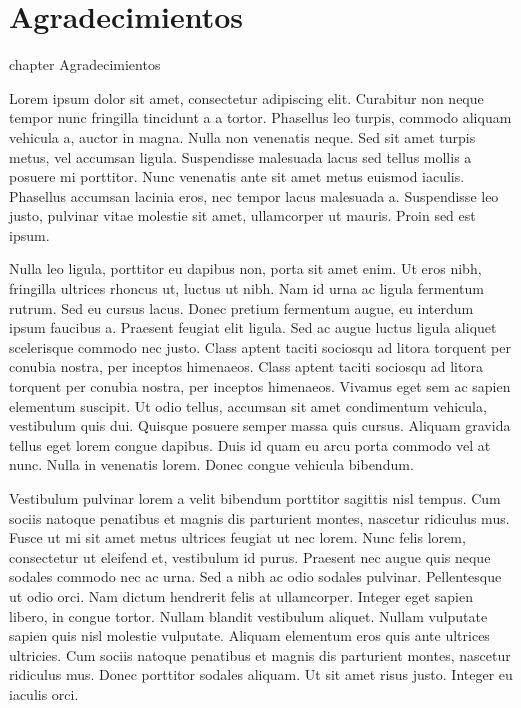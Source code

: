 \chapter*{Agradecimientos}
 {chapter} {Agradecimientos}%



Lorem ipsum dolor sit amet, consectetur adipiscing elit. Curabitur non
neque tempor nunc fringilla tincidunt a a tortor. Phasellus leo
turpis, commodo aliquam vehicula a, auctor in magna. Nulla non
venenatis neque. Sed sit amet turpis metus, vel accumsan
ligula. Suspendisse malesuada lacus sed tellus mollis a posuere mi
porttitor. Nunc venenatis ante sit amet metus euismod
iaculis. Phasellus accumsan lacinia eros, nec tempor lacus malesuada
a. Suspendisse leo justo, pulvinar vitae molestie sit amet,
ullamcorper ut mauris. Proin sed est ipsum.

Nulla leo ligula, porttitor eu dapibus non, porta sit amet enim. Ut
eros nibh, fringilla ultrices rhoncus ut, luctus ut nibh. Nam id urna
ac ligula fermentum rutrum. Sed eu cursus lacus. Donec pretium
fermentum augue, eu interdum ipsum faucibus a. Praesent feugiat elit
ligula. Sed ac augue luctus ligula aliquet scelerisque commodo nec
justo. Class aptent taciti sociosqu ad litora torquent per conubia
nostra, per inceptos himenaeos. Class aptent taciti sociosqu ad litora
torquent per conubia nostra, per inceptos himenaeos. Vivamus eget sem
ac sapien elementum suscipit. Ut odio tellus, accumsan sit amet
condimentum vehicula, vestibulum quis dui. Quisque posuere semper
massa quis cursus. Aliquam gravida tellus eget lorem congue
dapibus. Duis id quam eu arcu porta commodo vel at nunc. Nulla in
venenatis lorem. Donec congue vehicula bibendum.

Vestibulum pulvinar lorem a velit bibendum porttitor sagittis nisl
tempus. Cum sociis natoque penatibus et magnis dis parturient montes,
nascetur ridiculus mus. Fusce ut mi sit amet metus ultrices feugiat ut
nec lorem. Nunc felis lorem, consectetur ut eleifend et, vestibulum id
purus. Praesent nec augue quis neque sodales commodo nec ac urna. Sed
a nibh ac odio sodales pulvinar. Pellentesque ut odio orci. Nam dictum
hendrerit felis at ullamcorper. Integer eget sapien libero, in congue
tortor. Nullam blandit vestibulum aliquet. Nullam vulputate sapien
quis nisl molestie vulputate. Aliquam elementum eros quis ante
ultrices ultricies. Cum sociis natoque penatibus et magnis dis
parturient montes, nascetur ridiculus mus. Donec porttitor sodales
aliquam. Ut sit amet risus justo. Integer eu iaculis orci.

